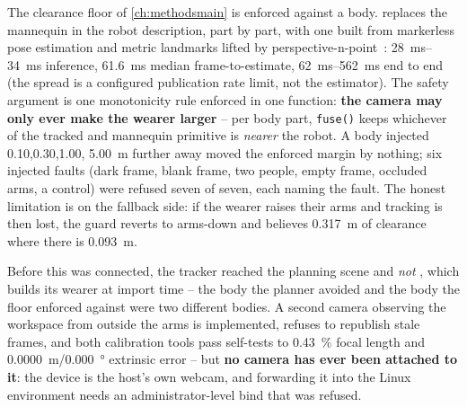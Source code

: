 The clearance floor of \cref{ch:methodsmain} is enforced against a body.
 replaces the mannequin in the robot
description, part by part, with one built from markerless pose estimation
and metric landmarks lifted by perspective-n-point~\cite{lugaresi2019mediapipe}:
\SIrange{28}{34}{\milli\second} inference, \SI{61.6}{\milli\second} median
frame-to-estimate, \SIrange{62}{562}{\milli\second} end to end (the spread is
a configured publication rate limit, not the estimator). The safety
argument is one monotonicity rule enforced in one function: \textbf{the
camera may only ever make the wearer larger} -- per body part,
\texttt{fuse()} keeps whichever of the tracked and mannequin primitive is
\emph{nearer} the robot. A body injected \SI{0.10}{},\SI{0.30}{},\SI{1.00}{},
\SI{5.00}{\metre} further away moved the enforced margin by nothing; six
injected faults (dark frame, blank frame, two people, empty frame, occluded
arms, a control) were refused seven of seven, each naming the fault. The
honest limitation is on the fallback side: if the wearer raises their arms
and tracking is then lost, the guard reverts to arms-down and believes
\SI{0.317}{\metre} of clearance where there is \SI{0.093}{\metre}.

Before this was connected, the tracker reached the planning scene and
\emph{not} , which builds its wearer at import time
-- the body the planner avoided and the body the floor enforced against were
two different bodies. A second camera observing the workspace from outside
the arms is implemented, refuses to republish stale frames, and both
calibration tools pass self-tests to \SI{0.43}{\percent} focal length and
\SI{0.0000}{\metre}/\SI{0.000}{\degree} extrinsic error -- but \textbf{no
camera has ever been attached to it}: the device is the host's own webcam,
and forwarding it into the Linux environment needs an administrator-level
bind that was refused.
